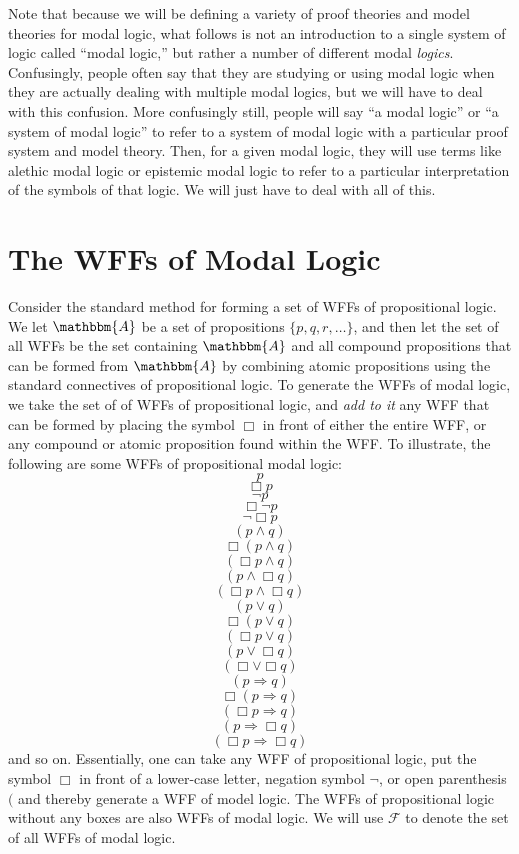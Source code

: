 \documentclass[11pt]{article}
\theoremstyle{definition}
\theoremstyle{remark}
\begin{document}
Note that because we will be defining a variety of proof theories and model theories for modal logic, what follows is not an introduction to a single system of logic called ``modal logic,'' but rather a number of different modal \textit{logics}. Confusingly, people often say that they are studying or using modal logic when they are actually dealing with multiple modal logics, but we will have to deal with this confusion. More confusingly still, people will say ``a modal logic'' or ``a system of modal logic'' to refer to a system of modal logic with a particular proof system and model theory. Then, for a given modal logic, they will use terms like alethic modal logic or epistemic modal logic to refer to a particular interpretation of the symbols of that logic. We will just have to deal with all of this.\par


\section{The WFFs of Modal Logic}
Consider the standard method for forming a set of WFFs of propositional logic. We let $\mathbbm{A}$ be a set of propositions $\{p,q,r,\dots\}$, and then let the set of all WFFs be the set containing $\mathbbm{A}$ and all compound propositions that can be formed from $\mathbbm{A}$ by combining atomic propositions using the standard connectives of propositional logic. To generate the WFFs of modal logic, we take the set of of WFFs of propositional logic, and \textit{add to it} any WFF that can be formed by placing the symbol $\Box$ in front of either the entire WFF, or any compound or atomic proposition found within the WFF. To illustrate, the following are some WFFs of propositional modal logic:
$$p$$
$$\Box p$$
$$\neg p$$
$$\Box\neg p$$
$$\neg\Box p$$
$$(p\wedge q)$$
$$\Box(p\wedge q)$$
$$(\Box p\wedge q)$$
$$(p\wedge \Box q)$$
$$(\Box p\wedge \Box q)$$
$$(p\vee q)$$
$$\Box(p\vee q)$$
$$(\Box p\vee q)$$
$$(p\vee \Box q)$$
$$(\Box \vee \Box q)$$
$$(p\Rightarrow q)$$
$$\Box(p\Rightarrow  q)$$
$$(\Box p\Rightarrow  q)$$
$$(p\Rightarrow  \Box q)$$
$$(\Box p\Rightarrow  \Box q)$$
and so on. Essentially, one can take any WFF of propositional logic, put the symbol $\Box$ in front of a lower-case letter, negation symbol $\neg$, or open parenthesis $($ and thereby generate a WFF of model logic. The WFFs of propositional logic without any boxes are also WFFs of modal logic. We will use $\mathcal{F}$ to denote the set of all WFFs of modal logic.\par
\end{document}
